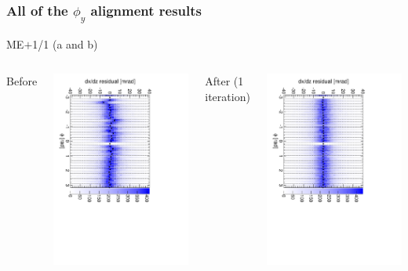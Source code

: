 \documentclass[compress]{beamer}
\begin{document}
\begin{frame}
\frametitle{All of the $\phi_y$ alignment results}
\begin{center}
ME$+$1/1 (a and b)
\end{center}

\begin{columns}
\centering Before

\includegraphics[height=\linewidth, angle=90]{iter01_mep11.pdf}

\centering After (1 iteration)

\includegraphics[height=\linewidth, angle=90]{iter02_mep11.pdf}
\end{columns}


\end{frame}
\end{document}
